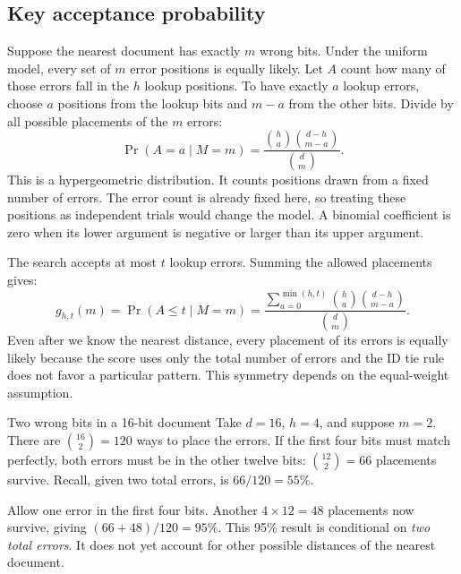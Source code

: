
\subsection{Key acceptance probability}
Suppose the nearest document has exactly $m$ wrong bits. Under the uniform model, every set of
$m$ error positions is equally likely. Let $A$ count how many of those errors fall in the $h$
lookup positions. To have exactly $a$ lookup errors, choose $a$ positions from the lookup bits
and $m-a$ from the other bits. Divide by all possible placements of the $m$ errors:
\begin{equation}
\Pr(A=a\mid M=m)=
\frac{\binom{h}{a}\binom{d-h}{m-a}}{\binom{d}{m}}.
\label{eq:prefix-error-placements}
\end{equation}
This is a hypergeometric distribution. It counts positions drawn from a fixed number of errors.
The error count is already fixed here, so treating these positions as independent trials
would change the model. A binomial coefficient is zero when its lower argument is negative or
larger than its upper argument.

The search accepts at most $t$ lookup errors. Summing the allowed placements gives:
\begin{equation}
g_{h,t}(m)=\Pr(A\le t\mid M=m)
=\frac{\displaystyle\sum_{a=0}^{\min(h,t)}
          \binom{h}{a}\binom{d-h}{m-a}}{\binom{d}{m}}.
\label{eq:prefix-survival}
\end{equation}
Even after we know the nearest distance, every placement of its errors is equally likely because the score
uses only the total number of errors and the ID tie rule does not favor a particular pattern.
This symmetry depends on the equal-weight assumption.

\begin{examplebox}{Two wrong bits in a 16-bit document}
Take $d=16$, $h=4$, and suppose $m=2$. There are $\binom{16}{2}=120$ ways to place the errors.
If the first four bits must match perfectly, both errors must be in the other twelve bits:
$\binom{12}{2}=66$ placements survive. Recall, given two total errors, is $66/120=55\%$.

Allow one error in the first four bits. Another $4\times12=48$ placements now survive, giving
$(66+48)/120=95\%$. This 95\% result is conditional on \emph{two total errors}. It does not yet account
for other possible distances of the nearest document.
\end{examplebox}

